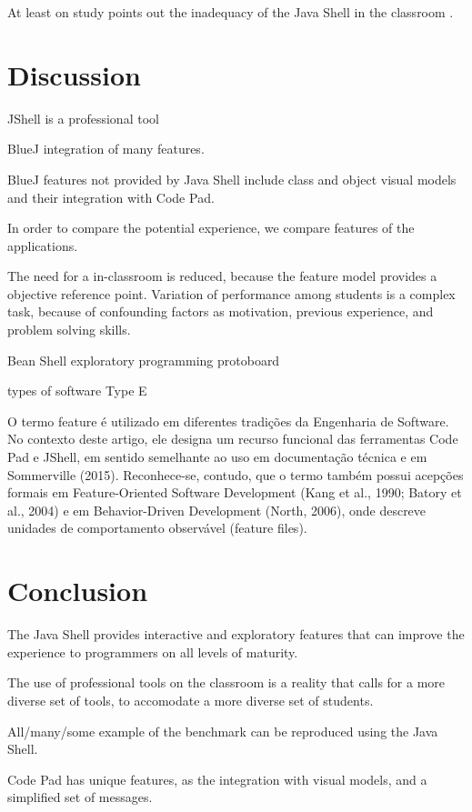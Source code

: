 \documentclass{article}
\begin{document}
At least on study points out the inadequacy of the Java Shell in the classroom
\cite{politz_minnes2018jshell}.

\section{Discussion}

JShell is a professional tool

BlueJ integration of many features.

BlueJ features not provided by Java Shell include class and object visual models and their integration with Code Pad.

In order to compare the potential experience, we compare features of the applications.

The need for a in-classroom is reduced, because the feature model provides a objective reference point. Variation of performance among students is a complex task, because of confounding factors as motivation, previous experience, and problem solving skills.

Bean Shell exploratory programming
protoboard

types of software 
Type E

O termo feature é utilizado em diferentes tradições da Engenharia de Software. No contexto deste artigo, ele designa um recurso funcional das ferramentas Code Pad e JShell, em sentido semelhante ao uso em documentação técnica e em Sommerville (2015).
Reconhece-se, contudo, que o termo também possui acepções formais em Feature-Oriented Software Development (Kang et al., 1990; Batory et al., 2004) e em Behavior-Driven Development (North, 2006), onde descreve unidades de comportamento observável (feature files).

\section{Conclusion}

The Java Shell provides interactive and exploratory features that can improve the experience to programmers on all levels of maturity.

The use of professional tools on the classroom is a reality that calls for a more diverse set of tools, to accomodate a more diverse set of students.

All/many/some example of the benchmark can be reproduced using the Java Shell.

Code Pad has unique features, as the integration with visual models, and a simplified set of messages. 
\end{document}
